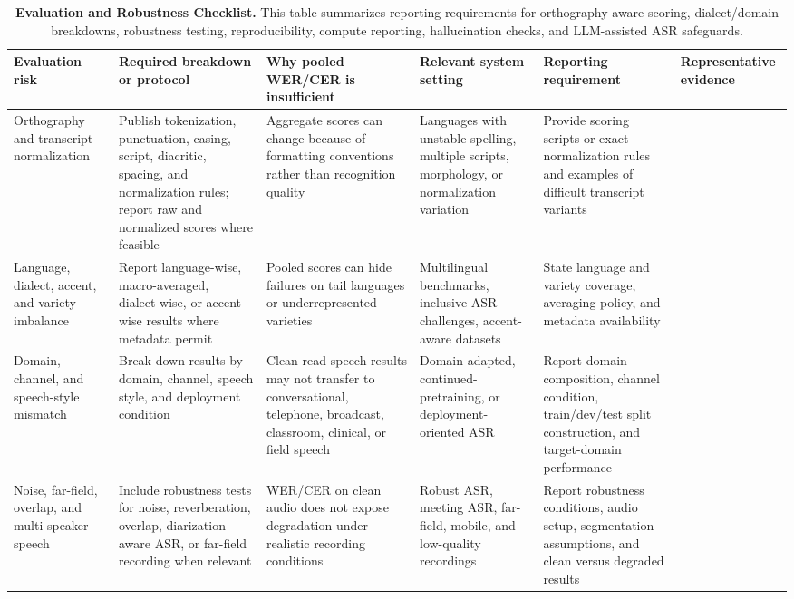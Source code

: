 \documentclass[pdflatex,sn-basic,iicol]{sn-jnl}
\theoremstyle{thmstyleone}
\theoremstyle{thmstyletwo}
\theoremstyle{thmstylethree}
\begin{document}
\begin{table}[htbp]
\setcounter{table}{4}
\footnotesize
\centering
\caption{\textbf{Evaluation and Robustness Checklist.} This table summarizes reporting requirements for orthography-aware scoring, dialect/domain breakdowns, robustness testing, reproducibility, compute reporting, hallucination checks, and LLM-assisted ASR safeguards.}
\label{tab:5}
\begin{tabularx}{\textwidth}{YYYYYY}
\toprule
\textbf{Evaluation risk} & \textbf{Required breakdown or protocol} & \textbf{Why pooled WER/CER is insufficient} & \textbf{Relevant system setting} & \textbf{Reporting requirement} & \textbf{Representative evidence} \\
\midrule
Orthography and transcript normalization & Publish tokenization, punctuation, casing, script, diacritic, spacing, and normalization rules; report raw and normalized scores where feasible & Aggregate scores can change because of formatting conventions rather than recognition quality & Languages with unstable spelling, multiple scripts, morphology, or normalization variation & Provide scoring scripts or exact normalization rules and examples of difficult transcript variants & \citep{karita2023lenient,thennal2024cer,lau2025_data_quality_multilingual_speech} \\
Language, dialect, accent, and variety imbalance & Report language-wise, macro-averaged, dialect-wise, or accent-wise results where metadata permit & Pooled scores can hide failures on tail languages or underrepresented varieties & Multilingual benchmarks, inclusive ASR challenges, accent-aware datasets & State language and variety coverage, averaging policy, and metadata availability & \citep{shi2023mlsuperb,conneau2022fleurs,chen2025mlsuperb2challenge,olatunji2023_afrispeech200} \\
Domain, channel, and speech-style mismatch & Break down results by domain, channel, speech style, and deployment condition & Clean read-speech results may not transfer to conversational, telephone, broadcast, classroom, clinical, or field speech & Domain-adapted, continued-pretraining, or deployment-oriented ASR & Report domain composition, channel condition, train/dev/test split construction, and target-domain performance & \citep{conneau2022xtreme_s,peterson2022_openasr21,tian24_interspeech} \\
Noise, far-field, overlap, and multi-speaker speech & Include robustness tests for noise, reverberation, overlap, diarization-aware ASR, or far-field recording when relevant & WER/CER on clean audio does not expose degradation under realistic recording conditions & Robust ASR, meeting ASR, far-field, mobile, and low-quality recordings & Report robustness conditions, audio setup, segmentation assumptions, and clean versus degraded results & \citep{watanabe2020chime6,cornell2023chime7} \\

\end{tabularx}
\end{table}
\end{document}
